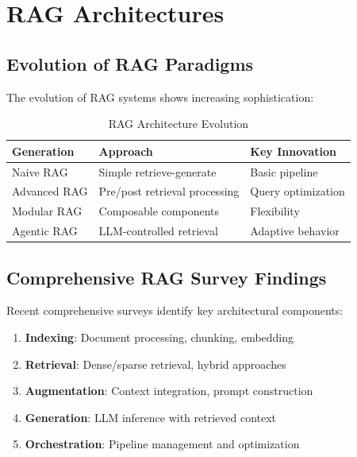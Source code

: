 \documentclass[12pt,a4paper]{article}
\begin{document}
\section{RAG Architectures}

\subsection{Evolution of RAG Paradigms}

The evolution of RAG systems shows increasing sophistication:

\begin{table}[H]
\centering
\caption{RAG Architecture Evolution}
\begin{tabular}{lll}
\toprule
\textbf{Generation} & \textbf{Approach} & \textbf{Key Innovation} \\
\midrule
Naive RAG & Simple retrieve-generate & Basic pipeline \\
Advanced RAG & Pre/post retrieval processing & Query optimization \\
Modular RAG & Composable components & Flexibility \\
Agentic RAG & LLM-controlled retrieval & Adaptive behavior \\
\bottomrule
\end{tabular}
\end{table}

\subsection{Comprehensive RAG Survey Findings}

Recent comprehensive surveys identify key architectural components:

\begin{tcolorbox}[colback=raggreen!10, colframe=raggreen, title=RAG Architecture Components]
\begin{enumerate}
    \item \textbf{Indexing}: Document processing, chunking, embedding
    \item \textbf{Retrieval}: Dense/sparse retrieval, hybrid approaches
    \item \textbf{Augmentation}: Context integration, prompt construction
    \item \textbf{Generation}: LLM inference with retrieved context
    \item \textbf{Orchestration}: Pipeline management and optimization
\end{enumerate}
\end{tcolorbox}
\end{document}
